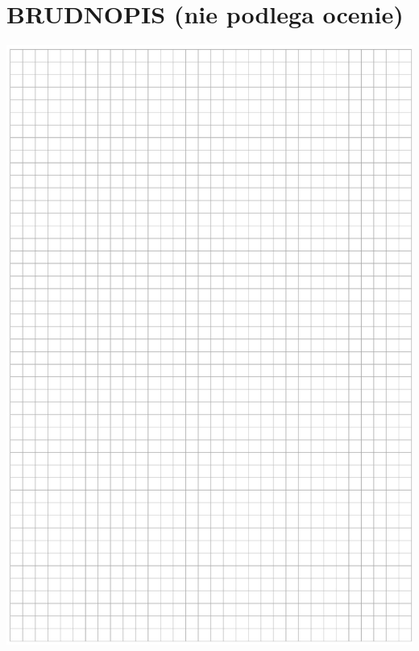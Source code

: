 \documentclass[10pt]{article}
\begin{document}
\section*{BRUDNOPIS (nie podlega ocenie)}
\includegraphics[max width=\textwidth, center]{2024_11_21_f1ecc00f5c4ab21f0d04g-25}\\
\end{document}
